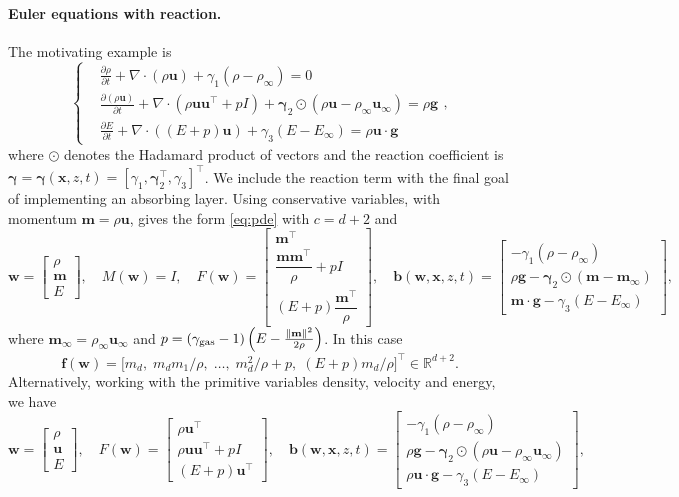 \documentclass[11pt]{article}
\newcommand{\Rbb}{\mathbb{R}}
\newcommand{\bw}{\mathbf{w}}
\newcommand{\bx}{\mathbf{x}}
\newcommand{\bb}{\mathbf{b}}
\newcommand{\bff}{\mathbf{f}}
\newcommand{\bu}{\mathbf{u}}
\newcommand{\mom}{\mathbf{m}}
\newcommand{\bg}{\mathbf{g}}
\begin{document}
	\paragraph{Euler equations with reaction.} The motivating example is
	\[
	\left\{
	\begin{aligned}
		&\frac{\partial\rho}{\partial t}+\nabla\cdot(\rho\bu)+\gamma_1(\rho-\rho_\infty)=0\\[0.6em]
		&\frac{\partial(\rho\bu)}{\partial t}+\nabla\cdot(\rho\bu\bu^\top+pI)+\bm{\gamma}_2\odot(\rho\bu-\rho_\infty\bu_\infty)=\rho\bg\\[0.6em]
		&\frac{\partial E}{\partial t}+\nabla\cdot((E+p)\bu)+\gamma_3(E-E_\infty)=\rho\bu\cdot\bg
	\end{aligned}
	\right.,
	\]
	where $\odot$ denotes the Hadamard product of vectors and the reaction coefficient is $\bm{\gamma}=\bm{\gamma}(\bx,z,t)=[\gamma_1,\bm{\gamma}_2^\top,\gamma_3]^\top$. We include the reaction term with the final goal of implementing an absorbing layer. Using conservative variables, with momentum $\mom=\rho\bu$, gives the form \eqref{eq:pde} with $c=d+2$ and
	\[
	\bw=\begin{bmatrix}\rho\\ \mom\\ E\end{bmatrix},\quad M(\bw)=I,\quad
	F(\bw)=\begin{bmatrix}\mom^\top\\ \dfrac{\mom\mom^\top}{\rho}+pI\\[0.6em] (E+p)\dfrac{\mom^\top}{\rho}\end{bmatrix},\quad
	\bb(\bw,\bx,z,t)=\begin{bmatrix}-\gamma_1(\rho-\rho_\infty)\\ \rho\bg-\bm{\gamma}_2\odot(\mom-\mom_\infty)\\ \mom\cdot\bg-\gamma_3(E-E_\infty)\end{bmatrix},
	\]
	where $\mom_\infty=\rho_\infty\bu_\infty$ and $p=(\gamma_{\rm gas}-1)\left(E-\frac{\lVert\mom\rVert^2}{2\rho}\right)$. In this case
	\[
	\bff(\bw)=\big[m_d,\;m_dm_1/\rho,\;\dots,\;m_d^2/\rho+p,\;(E+p)m_d/\rho\big]^\top\in\Rbb^{d+2}.
	\]
	Alternatively, working with the primitive variables density, velocity and energy, we have
	\[
	\bw=\begin{bmatrix}\rho\\ \bu\\ E\end{bmatrix},\quad
	F(\bw)=\begin{bmatrix}\rho\bu^\top\\ \rho\bu\bu^\top+pI\\[0.6em] (E+p)\bu^\top\end{bmatrix},\quad
	\bb(\bw,\bx,z,t)=\begin{bmatrix}-\gamma_1(\rho-\rho_\infty)\\ \rho\bg-\bm{\gamma}_2\odot(\rho\bu-\rho_\infty\bu_\infty)\\ \rho\bu\cdot\bg-\gamma_3(E-E_\infty)\end{bmatrix},
	\]
\end{document}

